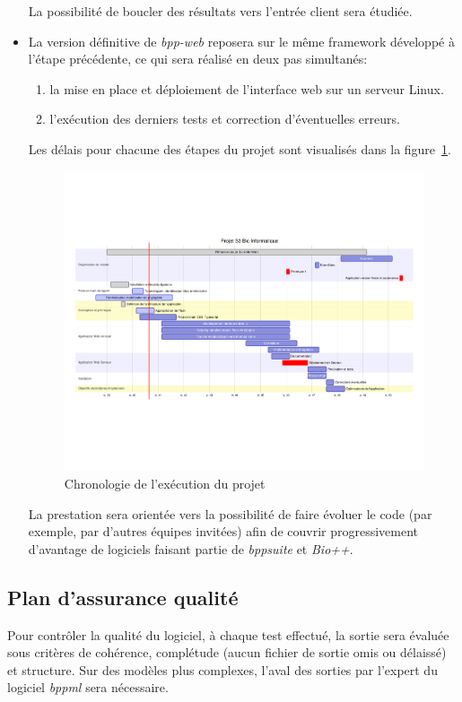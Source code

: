 \begin{itemize}[topsep=1ex,itemsep=1ex,partopsep=1ex,parsep=1ex]
	La possibilité de boucler des résultats vers l'entrée client sera étudiée.
	 
	\item La version définitive de \textit{bpp-web} reposera sur le même framework développé
	à l'étape précédente, ce qui sera réalisé en deux pas simultanés:
	\begin{enumerate}
		\item la mise en place et déploiement de l'interface web sur un serveur Linux.
		\item l'exécution des derniers tests et correction d'éventuelles erreurs.
	\end{enumerate}
	
	Les délais pour chacune des étapes du projet sont visualisés dans la figure~\ref{planning}.
	\begin{figure}[ht!]
		\caption{\label{planning} Chronologie de l'exécution du projet}
		\includegraphics[trim={1.5cm 8cm 2cm 8cm},clip,width=\textwidth]{fig/mermaid1.pdf}
	\end{figure}
	
	La prestation sera orientée vers la possibilité de faire évoluer le code (par exemple, par d'autres équipes invitées) 
	afin de couvrir progressivement d'avantage de logiciels faisant partie de \textit{bppsuite} et \textit{Bio++}.
\end{itemize}


\subsection{Plan d'assurance qualité}
 Pour contrôler la qualité du logiciel, à chaque test effectué, la sortie sera  
 évaluée sous critères de cohérence, complétude (aucun fichier de sortie omis ou délaissé)
 et structure. Sur des modèles plus complexes, l'aval des sorties par l'expert du logiciel \textit{bppml} sera nécessaire.

